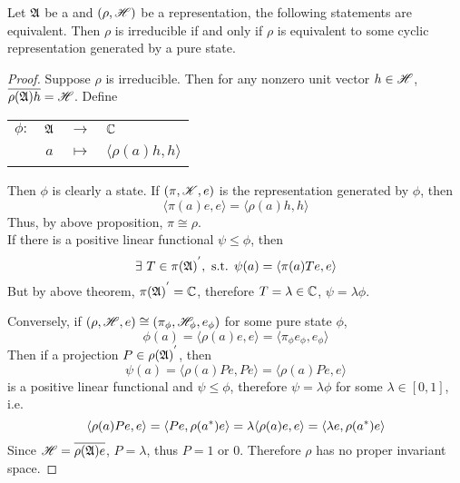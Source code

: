 \documentclass[a4paper,11pt]{report}
\begin{document}
\begin{thm}
	Let $\mathfrak{A}$ be a \Cs and $(\rho,\mathscr{H})$ be a representation, the following statements are equivalent. Then $\rho$ is irreducible if and only if $\rho$ is equivalent to some cyclic representation generated by a pure state.
\end{thm}
\begin{proof}
	Suppose $\rho$ is irreducible. Then for any nonzero unit vector $h \in \mathscr{H}$, $\overline{\rho(\mathfrak{A})h} = \mathscr{H}$. Define 
	\begin{center}
		\begin{tabular}{l c c l}
			$\phi \colon$ & $\mathfrak{A}$ & $\longrightarrow$ & $\mathbb{C}$ \\
			~ & $a$ & $\longmapsto$ & $\langle \rho(a)h,h \rangle$
		\end{tabular}
	\end{center}
	Then $\phi$ is clearly a state. If $(\pi,\mathscr{K},e)$ is the representation generated by $\phi$, then
	\begin{equation*}
		\langle \pi(a)e,e \rangle = \langle \rho(a)h,h \rangle
	\end{equation*}
	Thus, by above proposition, $\pi \cong \rho$. \\
	If there is a positive linear functional $\psi \leqslant \phi$, then
	\begin{equation*}
		\exists~ T \in {\pi(\mathfrak{A})}^{'},\text{ s.t. } \psi(a) = \langle \pi(a)Te,e \rangle
	\end{equation*}
	But by above theorem, ${\pi(\mathfrak{A})}^{'} = \mathbb{C}$, therefore $T = \lambda \in \mathbb{C}$, $\psi = \lambda \phi$.
	\item Conversely, if $(\rho,\mathscr{H},e) \cong (\pi_{\phi}, \mathscr{H}_{\phi},e_{\phi})$ for some pure state $\phi$, 
	\begin{equation*}
		\phi(a) = \langle \rho(a)e, e \rangle =\langle \pi_{\phi}e_{\phi}, e_{\phi} \rangle
	\end{equation*}
	Then if a projection $P \in {\rho(\mathfrak{A})}^{'}$, then
	\begin{equation*}
		\psi(a) = \langle \rho(a)Pe, Pe \rangle = \langle \rho(a)Pe, e \rangle
	\end{equation*}
	is a positive linear functional and $\psi \leqslant \phi$, therefore $\psi = \lambda \phi$ for some $\lambda \in [0,1]$, i.e.
	\begin{equation*}
		\langle \rho(a)Pe, e \rangle = \langle Pe, \rho(a^{*})e \rangle =\lambda\langle \rho(a)e, e \rangle = \langle \lambda e, \rho(a^{*})e \rangle
	\end{equation*}
	Since $\mathscr{H} = \overline{\rho(\mathfrak{A})e}$, $P = \lambda$, thus $P=1$ or $0$. Therefore $\rho$ has no proper invariant space.
\end{proof} 
\end{document}
